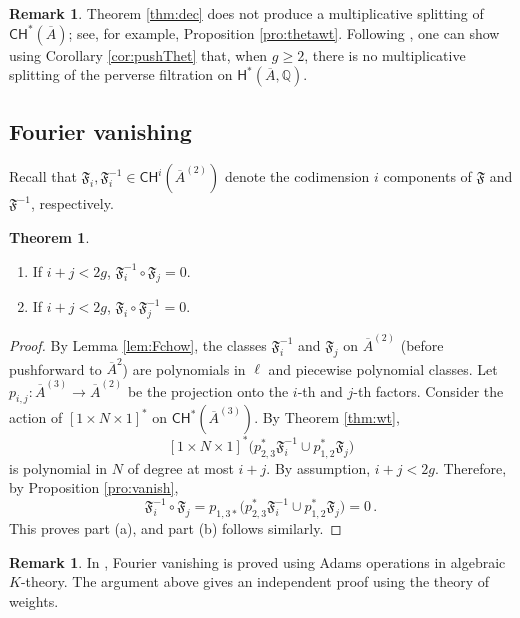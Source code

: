 \documentclass[11pt]{article}
\def\CH{\mathsf{CH}}
\def\QQ{\mathbb{Q}}
\def\fm{\mathfrak{F}}
\newcommand{\barA}{\overline{A}}
\theoremstyle{definition}
\newtheorem{theorem}[definition]{Theorem}
\newtheorem{remark}[definition]{Remark}
\begin{document}
\begin{remark}
    Theorem \ref{thm:dec} does not produce a multiplicative splitting of $\CH^*(\barA)$; see, for example, Proposition \ref{pro:thetawt}. Following \cite{BMSY1}, one can show using Corollary \ref{cor:pushThet} that, when $g\ge 2$, there is no multiplicative splitting of the perverse filtration on $\mathsf{H}^*(\barA,\QQ)$.
\end{remark}

\subsection{Fourier vanishing}

Recall that $\fm_i,\fm^{-1}_i\in\CH^i(\barA^{(2)})$ denote the codimension $i$ components of $\fm$ and $\fm^{-1}$, respectively.

\begin{theorem}\label{thm:fv}
    \begin{enumerate}[label = (\alph*)]
        \item If $i+j<2g$, $\fm_i^{-1} \circ \fm_j = 0$.
        \item If $i+j <2g$, $\fm_i \circ \fm_j^{-1} = 0$.
    \end{enumerate}
\end{theorem}

\begin{proof}
    By Lemma \ref{lem:Fchow}, the classes $\fm_i^{-1}$ and $\fm_j$ on $\barA^{(2)}$ (before pushforward to $\barA^2$) are polynomials in $\ell$ and piecewise polynomial classes.
    Let $p_{i,j} : \barA^{(3)} \to \barA^{(2)}$ be the projection onto the $i$-th and $j$-th factors. Consider the action of $[1 \times N \times 1]^*$ on $\CH^*(\barA^{(3)})$. By Theorem \ref{thm:wt},
    \[
    [1\times N \times 1]^*
    \bigl(p_{2,3}^*\fm_i^{-1} \cup p_{1,2}^*\fm_j\bigr)
    \]
    is polynomial in $N$ of degree at most $i+j$. By assumption, $i+j<2g$. Therefore, by Proposition \ref{pro:vanish},
    \[
    \fm_i^{-1} \circ \fm_j =
    p_{1,3*}\bigl(p_{2,3}^*\fm_i^{-1} \cup p_{1,2}^*\fm_j\bigr) = 0\,.
    \]
    This proves part (a), and part (b) follows similarly.
\end{proof}

\begin{remark}
    In \cite{PerverseFourierMSY25}, Fourier vanishing is proved using Adams
    operations in algebraic $K$-theory. The argument above gives an independent
    proof using the theory of weights.
\end{remark}
\end{document}
